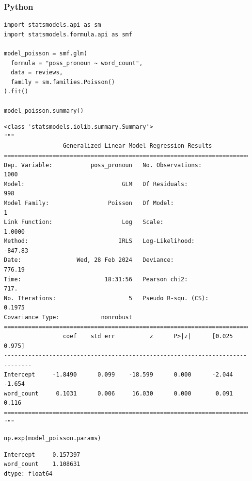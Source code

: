 \documentclass[
  letterpaper,
]{krantz}
\begin{document}
\subsubsection{Python}

\begin{verbatim}
import statsmodels.api as sm
import statsmodels.formula.api as smf

model_poisson = smf.glm(
  formula = "poss_pronoun ~ word_count",
  data = reviews,
  family = sm.families.Poisson()
).fit()

model_poisson.summary()        
\end{verbatim}

\begin{verbatim}
<class 'statsmodels.iolib.summary.Summary'>
"""
                 Generalized Linear Model Regression Results                  
==============================================================================
Dep. Variable:           poss_pronoun   No. Observations:                 1000
Model:                            GLM   Df Residuals:                      998
Model Family:                 Poisson   Df Model:                            1
Link Function:                    Log   Scale:                          1.0000
Method:                          IRLS   Log-Likelihood:                -847.83
Date:                Wed, 28 Feb 2024   Deviance:                       776.19
Time:                        18:31:56   Pearson chi2:                     717.
No. Iterations:                     5   Pseudo R-squ. (CS):             0.1975
Covariance Type:            nonrobust                                         
==============================================================================
                 coef    std err          z      P>|z|      [0.025      0.975]
------------------------------------------------------------------------------
Intercept     -1.8490      0.099    -18.599      0.000      -2.044      -1.654
word_count     0.1031      0.006     16.030      0.000       0.091       0.116
==============================================================================
"""
\end{verbatim}

\begin{verbatim}
np.exp(model_poisson.params)
\end{verbatim}

\begin{verbatim}
Intercept     0.157397
word_count    1.108631
dtype: float64
\end{verbatim}
\end{document}
